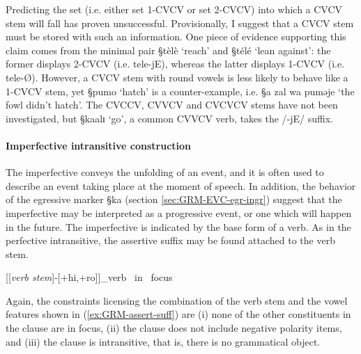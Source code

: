 Predicting the set (i.e. either set 1-CVCV or  set 2-CVCV) into which a CVCV
stem
will fall  has proven unsuccessful. Provisionally,  I suggest that a CVCV
stem must be stored with such an information. One piece of evidence
supporting this claim comes from
the minimal pair {\S tèlè} `reach' and  {\S télé} `lean against':  the
former displays 2-CVCV (i.e. tele-jE),  whereas the latter displays 1-CVCV
(i.e. tele-\O).  However,  a CVCV stem with round vowels is less likely to
behave like a 1-CVCV stem, yet {\S pumo} `hatch' is a counter-example, i.e.
{\S a zal wa puməje} `the fowl didn't hatch'. The CVCCV, CVVCV and CVCVCV stems
have  not been investigated, but {\S kaalɪ} `go', a common  CVVCV verb, takes
the
/-jE/ suffix.  


\paragraph{Imperfective intransitive construction}
\label{sec:GRM-verb-perf-intran}

The imperfective  conveys the unfolding of an event, and it is often used to
describe an event taking place at the moment of speech. In addition, the
behavior of the egressive marker {\S ka} (section \ref{sec:GRM-EVC-egr-ingr})
suggest that the imperfective may be interpreted as a progressive event,  or
one which will happen in the future.  The imperfective is indicated by the base
form of a verb. As in the perfective intransitive, the assertive suffix may be
found attached to the verb stem. 


\begin{exe}
\ex\label{ex:GRM-assert-suff}
[[{\it verb stem}]-[{\sc +hi,+ro}]]_{verb \ in \ focus}
\end{exe}

Again, the constraints licensing the combination of the verb stem and the vowel
features  shown in (\ref{ex:GRM-assert-suff})   are (i) none of the other
constituents in the clause are in focus, (ii) the clause does not include
negative polarity items, and (iii) the clause is intransitive, that is, there is
no grammatical object. 




